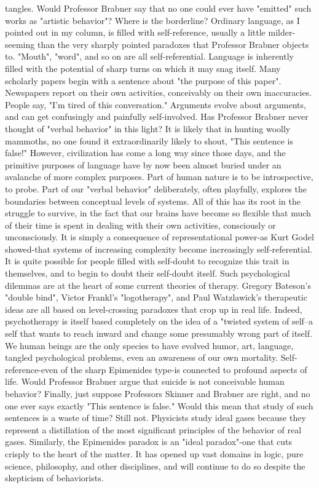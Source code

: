   tangles. Would Professor Brabner say that no one could ever have "emitted" such
  works as "artistic behavior"? Where is the borderline?
           Ordinary language, as I pointed out in my column, is filled with self-reference,
  usually a little milder-seeming than the very sharply pointed paradoxes that Professor
  Brabner objects to. "Mouth", "word", and so on are all self-referential. Language is
  inherently filled with the potential of sharp turns on which it may snag itself.
           Many scholarly papers begin with a sentence about "the purpose of this paper".
  Newspapers report on their own activities, conceivably on their own inaccuracies.
  People say, "I'm tired of this conversation." Arguments evolve about arguments, and
  can get confusingly and painfully self-involved. Has Professor Brabner never thought
  of "verbal behavior" in this light? It is likely that in hunting woolly mammoths, no one
  found it extraordinarily likely to shout, "This sentence is false!" However, civilization
  has come a long way since those days, and the primitive purposes of language have by
  now been almost buried under an avalanche of more complex purposes.
           Part of human nature is to be introspective, to probe. Part of our "verbal
  behavior" deliberately, often playfully, explores the boundaries between conceptual
  levels of systems. All of this has its root in the struggle to survive, in the fact that our
  brains have become so flexible that much of their time is spent in dealing with their
  own activities, consciously or unconsciously. It is simply a consequence of
  representational power-as Kurt Godel showed-that systems of increasing complexity
  become increasingly self-referential.
           It is quite possible for people filled with self-doubt to recognize this trait in
  themselves, and to begin to doubt their self-doubt itself. Such psychological dilemmas
  are at the heart of some current theories of therapy. Gregory Bateson's "double bind",
  Victor Frankl's "logotherapy", and Paul Watzlawick's therapeutic ideas are all based
  on level-crossing paradoxes that crop up in real life. Indeed, psychotherapy is itself
  based completely on the idea of a "twisted system of self--a self that wants to reach
  inward and change some presumably wrong part of itself.
           We human beings are the only species to have evolved humor, art, language,
  tangled psychological problems, even an awareness of our own mortality. Self-
  reference-even of the sharp Epimenides type-is connected to profound aspects of life.
  Would Professor Brabner argue that suicide is not conceivable human behavior?
           Finally, just suppose Professors Skinner and Brabner are right, and no one ever
  says exactly "This sentence is false." Would this mean that study of such sentences is a
  waste of time? Still not. Physicists study ideal gases because they represent a
  distillation of the most significant principles of the behavior of real gases. Similarly,
  the Epimenides paradox is an "ideal paradox"-one that cuts crisply to the heart of the
  matter. It has opened up vast domains in logic, pure science, philosophy, and other
  disciplines, and will continue to do so despite the skepticism of behaviorists.

